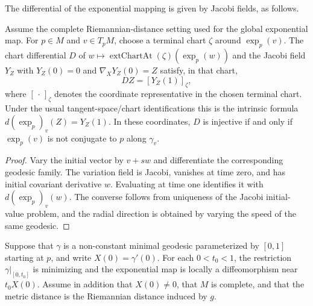 The differential of the exponential mapping is given by Jacobi
fields, as follows.

\begin{lemma}
\label{lem:exponential-differential-jacobi}




Assume the complete Riemannian-distance setting used for the global
exponential map. For $p\in M$ and $v\in T_pM$, choose a terminal chart
$\zeta$ around $\exp_p(v)$. The chart differential $D$ of
$w\mapsto\operatorname{extChartAt}(\zeta)(\exp_p(w))$ and the Jacobi field
$Y_Z$ with $Y_Z(0)=0$ and $\nabla_XY_Z(0)=Z$ satisfy, in that chart,
\[
D Z=[Y_Z(1)]_\zeta,
\]
where $[\,\cdot\,]_\zeta$ denotes the coordinate representative in the
chosen terminal chart.
Under the usual tangent-space/chart identifications this is the intrinsic
formula $d(\exp_p)_v(Z)=Y_Z(1)$. In these coordinates, $D$ is injective if
and only if $\exp_p(v)$ is not conjugate to $p$ along $\gamma_v$.
\end{lemma}

\begin{proof}
\sketch
{}
Vary the initial vector by $v+sw$ and differentiate the corresponding geodesic family. The variation field is Jacobi, vanishes at time zero, and has initial covariant derivative $w$. Evaluating at time one identifies it with $d(\exp_p)_v(w)$. The converse follows from uniqueness of the Jacobi initial-value problem, and the radial direction is obtained by varying the speed of the same geodesic.
\end{proof}

\begin{corollary}
\label{cor:exponential-local-diffeomorphism}

\label{star}



Suppose that $\gamma$ is a non-constant minimal geodesic parameterized by
$[0,1]$ starting at $p$, and write $X(0)=\gamma'(0)$. For each
$0<t_0<1$, the restriction $\gamma|_{[0,t_0]}$ is minimizing and the
exponential map is locally a diffeomorphism near $t_0X(0)$. Assume in
addition that $X(0)\ne0$, that $M$ is complete, and that the metric distance
is the Riemannian distance induced by $g$.
\end{corollary}

